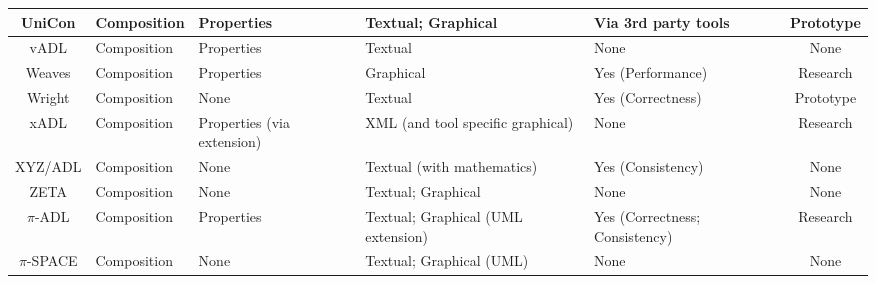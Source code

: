 \begin{landscape}
\begin{longtable}{|c|P{2cm}|P{3cm}|P{3cm}|p{2cm}|c|}
UniCon & Composition & Properties & Textual; Graphical & Via 3rd party tools & Prototype \\ 
\hline

vADL & Composition & Properties & Textual & None & None \\ 
\hline

Weaves & Composition & Properties & Graphical & Yes (Performance) & Research \\ 
\hline

Wright & Composition & None & Textual & Yes (Correctness) & Prototype \\ 
\hline

xADL & Composition & Properties (via extension) & XML (and tool specific graphical) & None & Research \\ 
\hline

XYZ/ADL & Composition & None & Textual (with mathematics) & Yes (Consistency) & None \\ 
\hline

ZETA & Composition & None & Textual; Graphical & None & None \\ 
\hline

$\pi$-ADL & Composition & Properties & Textual; Graphical (UML extension) & Yes (Correctness; Consistency) & Research \\ 
\hline

$\pi$-SPACE & Composition & None & Textual; Graphical (UML) & None & None \\ 
\hline

\end{longtable}
\end{landscape}

